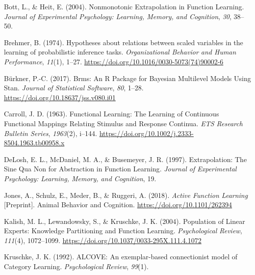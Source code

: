 \documentclass[
  letterpaper,
  DIV=11,
  numbers=noendperiod,
  oneside]{scrartcl}
\newlength{\cslhangindent}
\newenvironment{CSLReferences}[2] %
 {\begin{list}{}{%
  \setlength{\itemindent}{0pt}
  \setlength{\leftmargin}{0pt}
  \setlength{\parsep}{0pt}
  \ifodd #1
   \setlength{\leftmargin}{\cslhangindent}
   \setlength{\itemindent}{-1\cslhangindent}
  \fi
  \setlength{\itemsep}{#2\baselineskip}}}
 {\end{list}}
\begin{document}
\label{refs}
\begin{CSLReferences}{1}{0}
Bott, L., \& Heit, E. (2004). Nonmonotonic {Extrapolation} in {Function
Learning}. \emph{Journal of Experimental Psychology: Learning, Memory,
and Cognition}, \emph{30}, 38--50.

Brehmer, B. (1974). Hypotheses about relations between scaled variables
in the learning of probabilistic inference tasks. \emph{Organizational
Behavior and Human Performance}, \emph{11}(1), 1--27.
\url{https://doi.org/10.1016/0030-5073(74)90002-6}

Bürkner, P.-C. (2017). Brms: {An R Package} for {Bayesian Multilevel
Models Using Stan}. \emph{Journal of Statistical Software}, \emph{80},
1--28. \url{https://doi.org/10.18637/jss.v080.i01}

Carroll, J. D. (1963). Functional {Learning}: {The Learning} of
{Continuous Functional Mappings Relating Stimulus} and {Response
Continua}. \emph{ETS Research Bulletin Series}, \emph{1963}(2), i--144.
\url{https://doi.org/10.1002/j.2333-8504.1963.tb00958.x}

DeLosh, E. L., McDaniel, M. A., \& Busemeyer, J. R. (1997).
Extrapolation: {The Sine Qua Non} for {Abstraction} in {Function
Learning}. \emph{Journal of Experimental Psychology: Learning, Memory,
and Cognition}, 19.

Jones, A., Schulz, E., Meder, B., \& Ruggeri, A. (2018). \emph{Active
{Function Learning}} {[}Preprint{]}. {Animal Behavior and Cognition}.
\url{https://doi.org/10.1101/262394}

Kalish, M. L., Lewandowsky, S., \& Kruschke, J. K. (2004). Population of
{Linear Experts}: {Knowledge Partitioning} and {Function Learning}.
\emph{Psychological Review}, \emph{111}(4), 1072--1099.
\url{https://doi.org/10.1037/0033-295X.111.4.1072}

Kruschke, J. K. (1992). {ALCOVE}: {An} exemplar-based connectionist
model of {Category Learning}. \emph{Psychological Review}, \emph{99}(1).


\end{CSLReferences}
\end{document}
